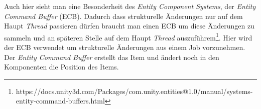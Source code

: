 Auch hier sieht man eine Besonderheit des \textit{Entity Component Systems}, der \textit{Entity Command Buffer} (ECB). Dadurch dass strukturelle Änderungen nur auf dem Haupt \textit{Thread} passieren dürfen braucht man einen ECB um diese Änderungen zu sammeln und an späteren Stelle auf dem Haupt \textit{Thread} auszuführem\footnote{https://docs.unity3d.com/Packages/com.unity.entities@1.0/manual/systems-entity-command-buffers.html}. Hier wird der ECB verwendet um strukturelle Änderungen aus einem Job vorzunehmen. Der \textit{Entity Command Buffer} erstellt das Item und ändert noch in den Komponenten die Position des Items.